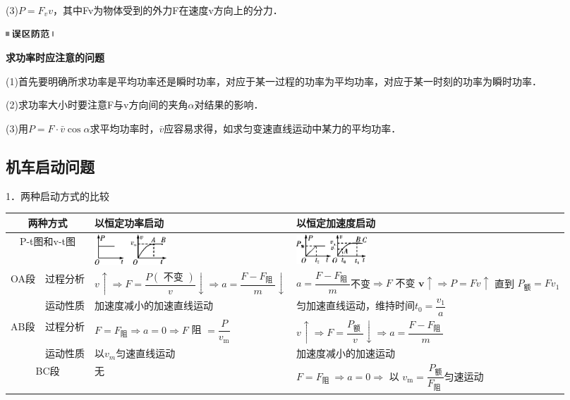\documentclass[cn,10.5pt,chinese,mac,chinesefont=founder]{elegantbook}
\begin{document}
(3)$P=F_v v$，其中Fv为物体受到的外力F在速度v方向上的分力．

\begin{center}\includegraphics[width=0.70833in,height=0.125in]{media/image34.png}

\textbf{求功率时应注意的问题}
\end{center}


(1)首先要明确所求功率是平均功率还是瞬时功率，对应于某一过程的功率为平均功率，对应于某一时刻的功率为瞬时功率．

(2)求功率大小时要注意F与v方向间的夹角$\alpha$对结果的影响．

(3)用$P=F \cdot \bar{v} \cos \alpha$求平均功率时，$\bar v$应容易求得，如求匀变速直线运动中某力的平均功率．

\subsection{机车启动问题}

1．两种启动方式的比较

\begin{longtable}[]{@{}m{1cm}m{1.5cm}m{5.5cm}m{5.3cm}@{}}
\toprule
\multicolumn{2}{c}{两种方式}
 & 以恒定功率启动 & 以恒定加速度启动 \tabularnewline
\midrule
\endhead
\multicolumn{2}{c}{P-t图和v-t图}
 &
\includegraphics[width=1.0625in,height=0.44792in]{media/image210.png} &
\includegraphics[width=1.04167in,height=0.4375in]{media/image211.png}\tabularnewline
\multirow{2}{1cm}{OA段}
&
过程分析 
&
$v \uparrow \Rightarrow F=\dfrac{P(\text { 不变 })}{v} \downarrow \Rightarrow a=\dfrac{F-F_{\text {阻 }}}{m}\downarrow$
&
$a=\dfrac{F-F_{\text {阻 }}}{m}$不变$ \Rightarrow F \text { 不变 } \boldsymbol{v} \uparrow \Rightarrow P=F v \uparrow$ 直到 $P_{\text {额}}=F v_{1}$\tabularnewline
 & 运动性质 & 加速度减小的加速直线运动 &
匀加速直线运动，维持时间$t_{0}=\dfrac{v_{1}}{a}$\tabularnewline
\multirow{2}{1cm}{AB段 }
& 过程分析 & $F=F_{\text {阻}} \Rightarrow a=0 \Rightarrow F$ 阻 $=\dfrac{P}{v_{\mathrm{m}}}$ & $v \uparrow \Rightarrow F=\dfrac{P_{\text {额 }}}{v} \downarrow \Rightarrow a=\dfrac{F-F_{\text {阻 }}}{m}$\tabularnewline
& 运动性质 & 以$v_m$匀速直线运动 & 加速度减小的加速运动\tabularnewline
\multicolumn{2}{c}{BC段} & 无 & $F=F_{\text {阻 }} \Rightarrow a=0 \Rightarrow$ 以 $v_{\mathrm{m}}=\dfrac{P_{\text {额}}}{F_{\text {阻 }}}$匀速运动\tabularnewline
\bottomrule
\end{longtable}
\end{document}
